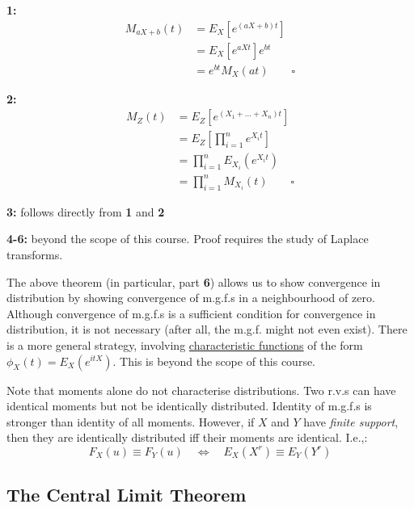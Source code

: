 \documentclass[12pt,a4paper]{article}
\begin{document}
{\bf 1: }
\begin{align*}
M_{aX+b}(t) &= E_X\left[e^{(aX+b)t}\right]\\
&= E_X\left[e^{aXt}\right]e^{bt}\\
&= e^{bt}M_X(at)\qquad\square
\end{align*}

{\bf 2: }
\begin{align*}
M_Z(t) &= E_Z\left[e^{\left(X_1+\hdots + X_n\right) t}\right]\\
&= E_Z\left[\prod_{i=1}^n e^{X_i t}\right]\\
&= \prod_{i=1}^n E_{X_i}\left(e^{X_it}\right)\\
&= \prod_{i=1}^n M_{X_i}(t)\qquad\square
\end{align*}

{\bf 3: } follows directly from {\bf 1} and {\bf 2}\par\vspace{1cm}

{\bf 4-6:} beyond the scope of this course. Proof requires the study of Laplace transforms.\par\vspace{1cm}

The above theorem (in particular, part {\bf 6}) allows us to show convergence in distribution by showing convergence of m.g.f.s in a neighbourhood of zero. Although convergence of m.g.f.s is a sufficient condition for convergence in distribution, it is not necessary (after all, the m.g.f. might not even exist). There is a more general strategy, involving \underline{characteristic functions} of the form $\phi_X(t) = E_X\left(e^{itX}\right)$. This is beyond the scope of this course.

Note that moments alone do not characterise distributions. Two r.v.s can have identical moments but not be identically distributed. Identity of m.g.f.s is stronger than identity of all moments. However, if $X$ and $Y$ have \emph{finite support}, then they are identically distributed iff their moments are identical. I.e.,:
$$F_X(u) \equiv F_Y(u)\quad\Leftrightarrow\quad E_X(X^r) \equiv E_Y(Y^r)$$

\subsection{The Central Limit Theorem}$\;$
\end{document}
